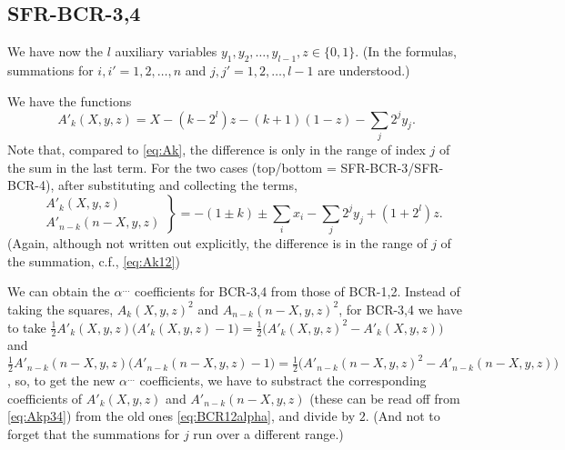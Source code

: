 \documentclass[a4paper,11pt]{article}
\begin{document}

\subsection{SFR-BCR-3,4}
We have now the $l$ auxiliary variables $y_1,y_2,\dots,y_{l-1},z\in\{0,1\}$.
(In the formulas, summations for $i,i' = 1,2,\dots,n$ and $j,j' = 1,2,\dots,l-1$ are understood.)

We have the functions
\begin{equation}
\label{eq:Akp}
A'_k(X,y,z) = X - (k-2^l)z - (k+1)(1-z) - \sum_{j}2^jy_j.
\end{equation}
Note that, compared to \eqref{eq:Ak},
 the difference is only in the range of index $j$ of the sum in the last term.
For the  two cases
(top/bottom = SFR-BCR-3/SFR-BCR-4),
after substituting and collecting the terms,
\begin{equation}
\label{eq:Akp34}
\left.\begin{aligned}
&A'_k(X,y,z) \\
&A'_{n-k}({n-X},y,z)
\end{aligned}\right\}
= -(1\pm k) \pm \sum_i x_i - \sum_j 2^jy_j + (1+2^l)z.
\end{equation}
(Again, although not written out explicitly,
the difference is in the range of $j$ of the summation, c.f., \eqref{eq:Ak12})

We can obtain the $\alpha^{\dots}$ coefficients for BCR-3,4
from those of BCR-1,2.
Instead of taking the squares, $A_k(X,y,z)^2$ and $A_{n-k}(n-X,y,z)^2$,
for BCR-3,4 we have to take
$\frac12 A'_k(X,y,z)\bigl(A'_k(X,y,z)-1\bigr)=\frac12\bigl(A'_k(X,y,z)^2-A'_k(X,y,z)\bigr)$ and
$\frac12 A'_{n-k}(n-X,y,z)\bigl(A'_{n-k}(n-X,y,z)-1\bigr)=\frac12\bigl(A'_{n-k}(n-X,y,z)^2-A'_{n-k}(n-X,y,z)\bigr)$,
so, to get the new $\alpha^{\dots}$ coefficients,
we have to substract the corresponding coefficients of $A'_k(X,y,z)$ and $A'_{n-k}(n-X,y,z)$
(these can be read off from \eqref{eq:Akp34})
from the old ones \eqref{eq:BCR12alpha}, and divide by $2$.
(And not to forget that the summations for $j$ run over a different range.)
\end{document}
